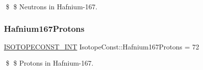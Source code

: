 \$ \$ Neutrons in Hafnium-\/167. \mbox{\label{group___isotope_const-_hafnium-_hf167_ga56699aa207004d0341049ce9295cb9f9}} 
\subsubsection{\texorpdfstring{Hafnium167\+Protons}{Hafnium167Protons}}
{\footnotesize\ttfamily \mbox{\hyperlink{group___isotope_const-_macros_ga5f18360b3e99483a35c32d789e62621c}{I\+S\+O\+T\+O\+P\+E\+C\+O\+N\+S\+T\+\_\+\+I\+NT}} Isotope\+Const\+::\+Hafnium167\+Protons = 72}

\$ \$ Protons in Hafnium-\/167. 